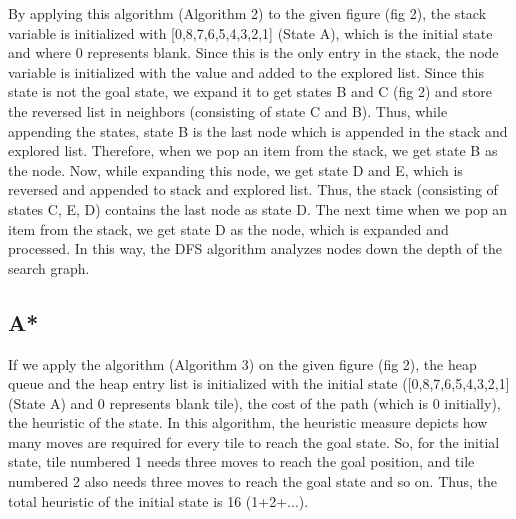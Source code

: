 \documentclass{svproc}
\begin{document}
\noindent By applying this algorithm (Algorithm 2) to the given figure (fig 2), the stack variable is initialized with [0,8,7,6,5,4,3,2,1] (State A), which is the initial state and where 0 represents blank. Since this is the only entry in the stack, the node variable is initialized with the value and added to the explored list. Since this state is not the goal state, we expand it to get states B and C (fig 2) and store the reversed list in neighbors (consisting of state C and B). Thus, while appending the states, state B is the last node which is appended in the stack and explored list. Therefore, when we pop an item from the stack, we get state B as the node. Now, while expanding this node, we get state D and E, which is reversed and appended to stack and explored list. Thus, the stack (consisting of states C, E, D) contains the last node as state D. The next time when we pop an item from the stack, we get state D as the node, which is expanded and processed. In this way, the DFS algorithm analyzes nodes down the depth of the search graph.

\subsection{A*}
If we apply the algorithm (Algorithm 3)  on the given figure (fig 2), the heap queue and the heap entry list is initialized with the initial state ([0,8,7,6,5,4,3,2,1] (State A) and 0 represents blank tile), the cost of the path (which is 0 initially), the heuristic of the state. In this algorithm, the heuristic measure depicts how many moves are required for every tile to reach the goal state. So, for the initial state, tile numbered 1 needs three moves to reach the goal position, and tile numbered 2 also needs three moves to reach the goal state and so on. Thus, the total heuristic of the initial state is 16 (1+2+...).
\end{document}
